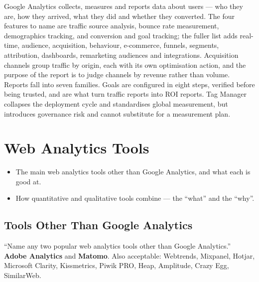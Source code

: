 \documentclass{MMTextbook}
\begin{document}
\begin{summarybox}
Google Analytics collects, measures and reports data about users --- who they
are, how they arrived, what they did and whether they converted. The four
features to name are traffic source analysis, bounce rate measurement,
demographics tracking, and conversion and goal tracking; the fuller list adds
real-time, audience, acquisition, behaviour, e-commerce, funnels, segments,
attribution, dashboards, remarketing audiences and integrations. Acquisition
channels group traffic by origin, each with its own optimisation action, and the
purpose of the report is to judge channels by revenue rather than volume. Reports
fall into seven families. Goals are configured in eight steps, verified before
being trusted, and are what turn traffic reports into ROI reports. Tag Manager
collapses the deployment cycle and standardises global measurement, but
introduces governance risk and cannot substitute for a measurement plan.
\end{summarybox}

\chapter{Web Analytics Tools}


\begin{learningoutcomes}
\begin{itemize}
\item The main web analytics tools other than Google Analytics, and what each is
      good at.
\item How quantitative and qualitative tools combine --- the ``what'' and the
      ``why''.
\end{itemize}
\end{learningoutcomes}

\section{Tools Other Than Google Analytics}

\begin{exambox}
``Name any two popular web analytics tools other than Google Analytics.''
\textbf{Adobe Analytics} and \textbf{Matomo}. Also acceptable: Webtrends,
Mixpanel, Hotjar, Microsoft Clarity, Kissmetrics, Piwik PRO, Heap, Amplitude,
Crazy Egg, SimilarWeb.
\end{exambox}
\end{document}
